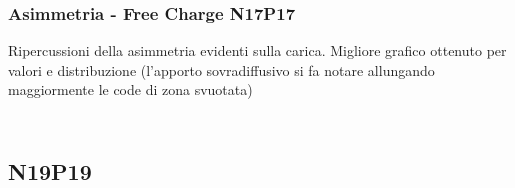 \begin{frame}
\frametitle{Asimmetria - Free Charge N17P17}
Ripercussioni della asimmetria evidenti sulla carica. Migliore grafico ottenuto per valori e distribuzione (l'apporto sovradiffusivo si fa notare allungando maggiormente le code di zona svuotata)
\begin{columns}

\begin{column}{0.3 \textwidth}
\begin{center}
\begin{figure}[!h]
          \end{figure}
\end{center}
\end{column}

\begin{column}{0.3 \textwidth}
\begin{center}
\begin{figure}[!h]
\end{figure}
\end{center}
\end{column}

\begin{column}{0.3 \textwidth}
\begin{center}
\begin{figure}[!h]
\end{figure}
\end{center}
\end{column}

\end{columns}

\end{frame}

\subsection{N19P19}
\begin{frame}
\tableofcontents[currentsection]
\end{frame}

